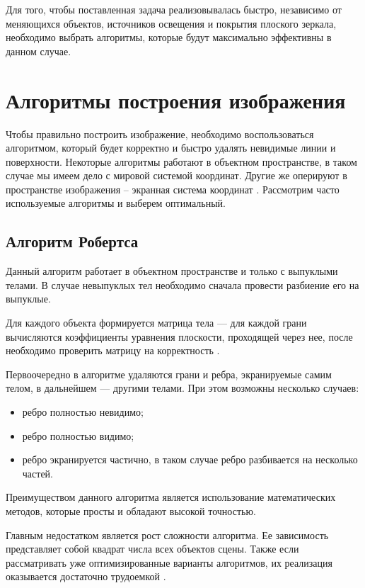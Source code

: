 Для того, чтобы поставленная задача реализовывалась быстро, независимо от меняющихся объектов, источников освещения и покрытия плоского зеркала, необходимо выбрать алгоритмы, которые будут максимально эффективны в данном случае.

\section{Алгоритмы построения изображения}

Чтобы правильно построить изображение, необходимо воспользоваться алгоритмом, который будет корректно и быстро удалять невидимые линии и поверхности. Некоторые алгоритмы работают в объектном пространстве, в таком случае мы имеем дело с мировой системой координат. Другие же оперируют в пространстве изображения -- экранная система координат \cite{alg_3d_graph}. Рассмотрим часто используемые алгоритмы и выберем оптимальный.

\subsection{Алгоритм Робертса}

Данный алгоритм работает в объектном пространстве и только с выпуклыми телами. В случае невыпуклых тел необходимо сначала провести разбиение его на выпуклые.

Для каждого объекта формируется матрица тела — для каждой грани вычисляются коэффициенты уравнения плоскости, проходящей через нее, после необходимо проверить матрицу на корректность \cite{rodz}.

Первоочередно в алгоритме удаляются грани и ребра, экранируемые самим телом, в дальнейшем — другими телами. При этом возможны несколько случаев:
\begin{itemize}
	\item ребро полностью невидимо;
	\item ребро полностью видимо;
	\item ребро экранируется частично, в таком случае ребро разбивается на несколько частей.
\end{itemize}

Преимуществом данного алгоритма является использование математических методов, которые просты и обладают высокой точностью.

Главным недостатком является рост сложности алгоритма. Ее зависимость представляет собой квадрат числа всех объектов сцены. Также если рассматривать уже оптимизированные варианты алгоритмов, их реализация оказывается достаточно трудоемкой \cite{alg_comp_graph}.

